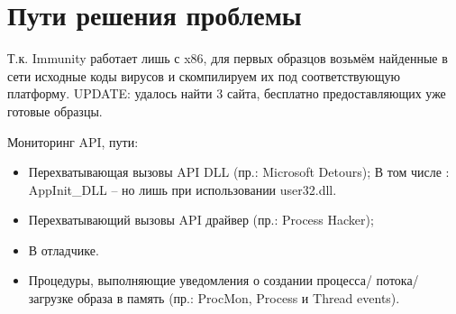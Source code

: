 \section {Пути решения проблемы}
Т.к. Immunity работает лишь с x86, для первых образцов возьмём найденные в сети
исходные коды вирусов и скомпилируем их под соответствующую платформу.
UPDATE: удалось найти 3 сайта, бесплатно предоставляющих уже готовые образцы.

Мониторинг API, пути:
\begin {itemize}
	\item Перехватывающая вызовы API DLL (пр.: Microsoft Detours);
	В том числе : AppInit\_DLL – но лишь при использовании user32.dll.
	\item Перехватывающий вызовы API драйвер (пр.: Process Hacker);
	\item В отладчике.
	\item Процедуры, выполняющие уведомления о создании процесса/ потока/ загрузке образа в память (пр.:
 	ProcMon, Process и Thread events).
\end {itemize}
